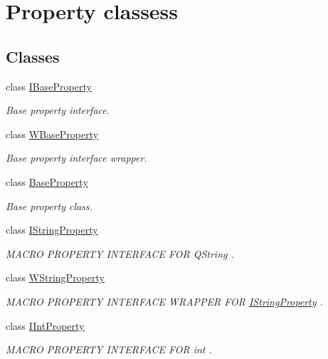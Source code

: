 \hypertarget{group___property_classes}{\section{Property classess}
\label{group___property_classes}
}
\subsection*{Classes}
\begin{DoxyCompactItemize}
\item 
class \hyperlink{class_i_base_property}{I\-Base\-Property}
\begin{DoxyCompactList}\small\item\em Base property interface. \end{DoxyCompactList}\item 
class \hyperlink{class_w_base_property}{W\-Base\-Property}
\begin{DoxyCompactList}\small\item\em Base property interface wrapper. \end{DoxyCompactList}\item 
class \hyperlink{class_base_property}{Base\-Property}
\begin{DoxyCompactList}\small\item\em Base property class. \end{DoxyCompactList}\item 
class \hyperlink{class_i_string_property}{I\-String\-Property}
\begin{DoxyCompactList}\small\item\em M\-A\-C\-R\-O P\-R\-O\-P\-E\-R\-T\-Y I\-N\-T\-E\-R\-F\-A\-C\-E F\-O\-R Q\-String . \end{DoxyCompactList}\item 
class \hyperlink{class_w_string_property}{W\-String\-Property}
\begin{DoxyCompactList}\small\item\em M\-A\-C\-R\-O P\-R\-O\-P\-E\-R\-T\-Y I\-N\-T\-E\-R\-F\-A\-C\-E W\-R\-A\-P\-P\-E\-R F\-O\-R \hyperlink{class_i_string_property}{I\-String\-Property} . \end{DoxyCompactList}\item 
class \hyperlink{class_i_int_property}{I\-Int\-Property}
\begin{DoxyCompactList}\small\item\em M\-A\-C\-R\-O P\-R\-O\-P\-E\-R\-T\-Y I\-N\-T\-E\-R\-F\-A\-C\-E F\-O\-R int . \end{DoxyCompactList}\item 

\end{DoxyCompactItemize}
